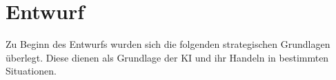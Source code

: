

\chapter{Entwurf}

Zu Beginn des Entwurfs wurden sich die folgenden strategischen Grundlagen überlegt. Diese dienen als Grundlage der KI und ihr Handeln in bestimmten Situationen. 

